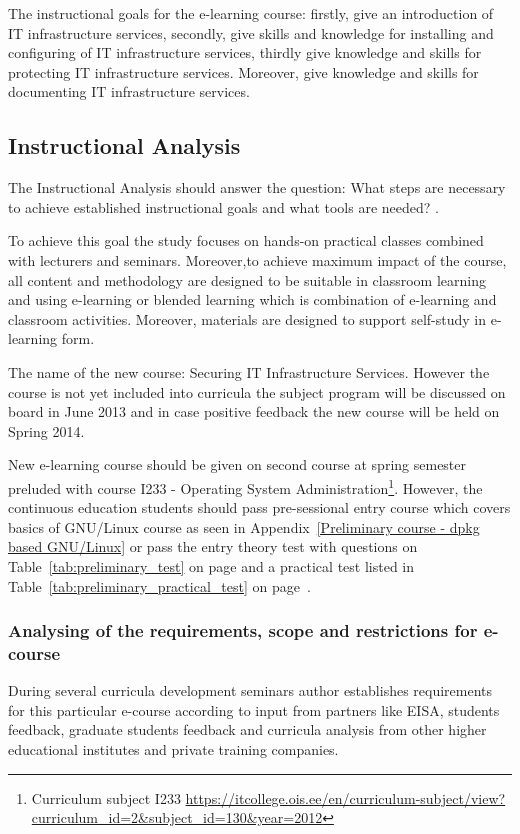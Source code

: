 The instructional goals for the e-learning course: firstly, give an introduction of IT infrastructure services, secondly, give skills and knowledge for installing and configuring of IT infrastructure services, thirdly give knowledge and skills for protecting IT infrastructure services. Moreover, give knowledge and skills for documenting IT infrastructure services.

\subsection{Instructional Analysis}
The Instructional Analysis should answer the question: What steps are necessary to achieve  established instructional goals and what tools are needed? \citep{website:addie}.

To achieve this goal the study focuses on hands-on practical classes combined with lecturers and seminars. Moreover,to achieve maximum impact of the course, all content and methodology are designed to be suitable in classroom learning and using e-learning or blended learning which is combination of e-learning and classroom activities. Moreover, materials are designed to support self-study in e-learning form.

The name of the new course: Securing IT Infrastructure Services. However the course is not yet included into curricula the subject program will be discussed on board in June 2013 and in case positive feedback the new course will be held on Spring 2014.

New e-learning course should be given on second course at spring semester preluded with course I233 - Operating System Administration\footnote{Curriculum subject I233 \url{https://itcollege.ois.ee/en/curriculum-subject/view?curriculum_id=2&subject_id=130&year=2012}}. However, the continuous education students should pass pre-sessional entry course which covers basics of GNU/Linux course as seen in Appendix~\ref{Preliminary course - dpkg based GNU/Linux} or pass the entry theory test with questions on Table~\ref{tab:preliminary_test} on page \pageref{tab:preliminary_test} and a practical test listed in Table~\ref{tab:preliminary_practical_test} on page~\pageref{tab:preliminary_practical_test}.

\subsubsection{Analysing of the requirements, scope and restrictions for e-course}
During several curricula development seminars author establishes requirements for this particular e-course according to input from partners like \gls{EISA}, students feedback, graduate students feedback and curricula analysis from other higher educational institutes and private training companies. 

